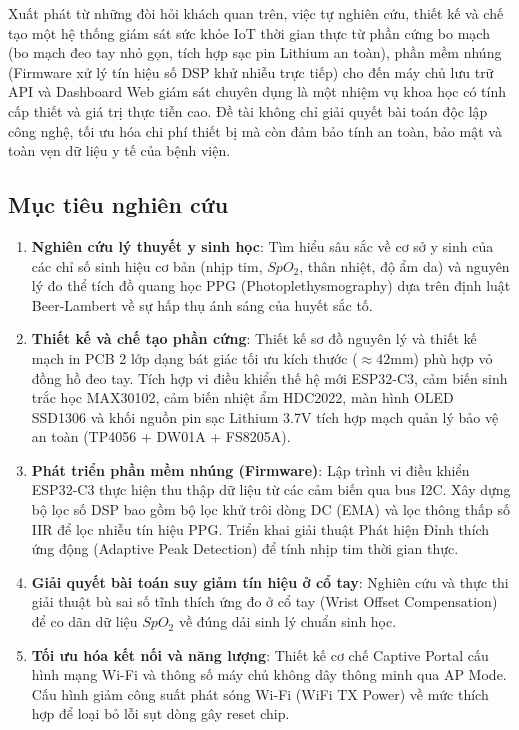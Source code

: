 Xuất phát từ những đòi hỏi khách quan trên, việc tự nghiên cứu, thiết kế và chế tạo một hệ thống giám sát sức khỏe IoT thời gian thực từ phần cứng bo mạch (bo mạch đeo tay nhỏ gọn, tích hợp sạc pin Lithium an toàn), phần mềm nhúng (Firmware xử lý tín hiệu số DSP khử nhiễu trực tiếp) cho đến máy chủ lưu trữ API và Dashboard Web giám sát chuyên dụng là một nhiệm vụ khoa học có tính cấp thiết và giá trị thực tiễn cao. Đề tài không chỉ giải quyết bài toán độc lập công nghệ, tối ưu hóa chi phí thiết bị mà còn đảm bảo tính an toàn, bảo mật và toàn vẹn dữ liệu y tế của bệnh viện.

\subsection{Mục tiêu nghiên cứu}

\begin{enumerate}
    \item \textbf{Nghiên cứu lý thuyết y sinh học}: Tìm hiểu sâu sắc về cơ sở y sinh của các chỉ số sinh hiệu cơ bản (nhịp tim, $SpO_2$, thân nhiệt, độ ẩm da) và nguyên lý đo thể tích đồ quang học PPG (Photoplethysmography) dựa trên định luật Beer-Lambert về sự hấp thụ ánh sáng của huyết sắc tố.
    \item \textbf{Thiết kế và chế tạo phần cứng}: Thiết kế sơ đồ nguyên lý và thiết kế mạch in PCB 2 lớp dạng bát giác tối ưu kích thước ($\approx 42\text{mm}$) phù hợp vỏ đồng hồ đeo tay. Tích hợp vi điều khiển thế hệ mới ESP32-C3, cảm biến sinh trắc học MAX30102, cảm biến nhiệt ẩm HDC2022, màn hình OLED SSD1306 và khối nguồn pin sạc Lithium 3.7V tích hợp mạch quản lý bảo vệ an toàn (TP4056 + DW01A + FS8205A).
    \item \textbf{Phát triển phần mềm nhúng (Firmware)}: Lập trình vi điều khiển ESP32-C3 thực hiện thu thập dữ liệu từ các cảm biến qua bus I2C. Xây dựng bộ lọc số DSP bao gồm bộ lọc khử trôi dòng DC (EMA) và lọc thông thấp số IIR để lọc nhiễu tín hiệu PPG. Triển khai giải thuật Phát hiện Đỉnh thích ứng động (Adaptive Peak Detection) để tính nhịp tim thời gian thực.
    \item \textbf{Giải quyết bài toán suy giảm tín hiệu ở cổ tay}: Nghiên cứu và thực thi giải thuật bù sai số tĩnh thích ứng đo ở cổ tay (Wrist Offset Compensation) để co dãn dữ liệu $SpO_2$ về đúng dải sinh lý chuẩn sinh học.
    \item \textbf{Tối ưu hóa kết nối và năng lượng}: Thiết kế cơ chế Captive Portal cấu hình mạng Wi-Fi và thông số máy chủ không dây thông minh qua AP Mode. Cấu hình giảm công suất phát sóng Wi-Fi (WiFi TX Power) về mức thích hợp để loại bỏ lỗi sụt dòng gây reset chip.

\end{enumerate}
